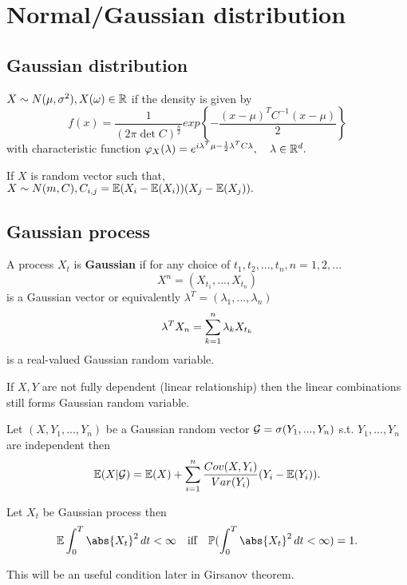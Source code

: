 \newpage
\section{Normal/Gaussian distribution}
\subsection{Gaussian distribution}
$X\sim N(\mu, \sigma^2), X(\omega)\in\mathbb{R}$ if the density is given by 
\begin{equation*}
    f(x) = \frac{1}{(2\pi \det C)^{\frac{n}{2}}} exp\left\{-\frac{(x-\mu)^TC^{-1}(x-\mu)}{2} \right\}
\end{equation*}
with characteristic function $\varphi_X(\lambda) = e^{i\lambda^T \mu - \frac{1}{2}\lambda^T C \lambda}, \quad \lambda \in \mathbb{R}^d.$

If $X$ is random vector such that, $X\sim N(m, C), C_{i,j} = \mathbb{E}(X_i - \mathbb{E}(X_i))(X_j - \mathbb{E}(X_j)).$ 

\subsection{Gaussian process}
\begin{dfn}
A process $X_t$ is \textbf{Gaussian} if for any choice of $t_1, t_2, ..., t_n, n = 1,2,...$
\begin{equation*}
    X^n = (X_{t_1}, ..., X_{t_n})
\end{equation*}  is a Gaussian vector or equivalently $\lambda^T = (\lambda_1, ..., \lambda_n)$
\begin{equation*}
    \lambda^T X_n = \sum\limits_{k=1}^n \lambda_k X_{t_k}
\end{equation*}is a real-valued Gaussian random variable.
\end{dfn}
\begin{thm}
If $X, Y$ are not fully dependent (linear relationship) then the linear combinations still forms Gaussian random variable.
\end{thm}

\begin{thm}
Let $(X, Y_1, ..., Y_n)$ be a Gaussian random vector $\mathcal{G} =\sigma(Y_1, ..., Y_n)$ s.t. $Y_1, ..., Y_n$ are independent then
\begin{equation*}
    \mathbb{E}(X|\mathcal{G}) = \mathbb{E}(X) + \sum\limits_{i=1}^n \frac{Cov(X, Y_i)}{Var(Y_i)} (Y_i - \mathbb{E}(Y_i)).
\end{equation*}
\end{thm}

\begin{thm}
Let $X_t$ be Gaussian process then
\begin{equation*}
    \E\int_0^T \abs{X_t}^2 \diff t < \infty \quad \text{iff} \quad \prob(\int_0^T \abs{X_t}^2 \diff t < \infty) = 1.
\end{equation*}
\end{thm}
This will be an useful condition later in Girsanov theorem.